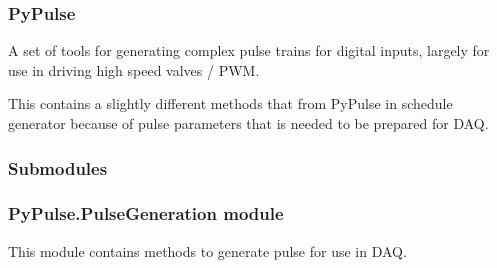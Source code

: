 \documentclass[letterpaper,10pt,english]{sphinxmanual}
\begin{document}
\subsubsection{PyPulse}
\label{\detokenize{NoSeMazeController/PyPulse:pypulse}}
\sphinxAtStartPar
A set of tools for generating complex pulse trains for digital inputs, largely for use in driving high speed valves / PWM.

\sphinxAtStartPar
This contains a slightly different methods that from PyPulse in schedule generator because of pulse parameters that is needed to be prepared for DAQ.


\subsubsection{Submodules}
\label{\detokenize{NoSeMazeController/PyPulse:submodules}}

\subsubsection{PyPulse.PulseGeneration module}
\label{\detokenize{NoSeMazeController/PyPulse:module-PyPulse.PulseGeneration}}\label{\detokenize{NoSeMazeController/PyPulse:pypulse-pulsegeneration-module}}
\sphinxAtStartPar
This module contains methods to generate pulse for use in DAQ.

\begin{fulllineitems}
\label{\detokenize{NoSeMazeController/PyPulse:PyPulse.PulseGeneration.concatenated_pulse}}
\pysigstartsignatures
{}
\pysigstopsignatures
\end{fulllineitems}


\begin{fulllineitems}
\label{\detokenize{NoSeMazeController/PyPulse:PyPulse.PulseGeneration.dummy_noise_pulse}}
\pysigstartsignatures
{}
\pysigstopsignatures
\end{fulllineitems}
\end{document}
